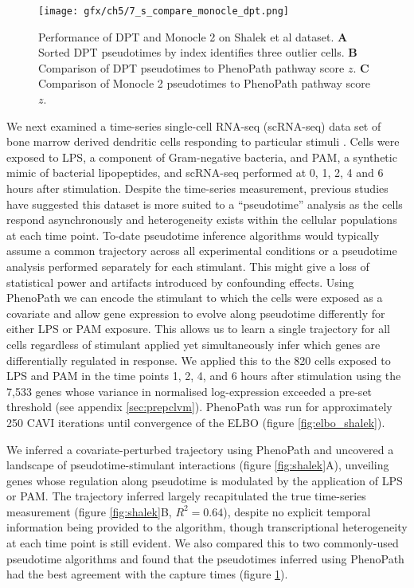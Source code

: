 \begin{figure}
   \texttt{[image: gfx/ch5/7\_s\_compare\_monocle\_dpt.png]}
   \caption{Performance of DPT and Monocle 2 on Shalek et al dataset.
\textbf{A} Sorted DPT pseudotimes by index identifies three outlier cells. \textbf{B} Comparison of DPT pseudotimes to PhenoPath pathway score $z$. \textbf{C} Comparison of Monocle 2 pseudotimes to PhenoPath pathway score $z$.}
	\label{fig:shalek_comparison}
\end{figure}

We next examined a time-series single-cell RNA-seq (scRNA-seq) data set of bone marrow derived dendritic cells responding to particular stimuli \cite{Shalek2014-cg}. Cells were exposed to LPS, a component of Gram-negative bacteria, and PAM, a synthetic mimic of bacterial lipopeptides, and scRNA-seq performed at 0, 1, 2, 4 and 6 hours after stimulation. Despite the time-series measurement, previous studies have suggested this dataset is more suited to a ``pseudotime'' analysis as the cells respond asynchronously and heterogeneity exists within the cellular populations at each time point\cite{Reid2016-yo}. To-date pseudotime inference algorithms would typically assume a common trajectory across all experimental conditions or a pseudotime analysis  performed separately for each stimulant. This might give a loss of statistical power and artifacts introduced by confounding effects. Using PhenoPath we can encode the stimulant to which the cells were exposed as a covariate and allow gene expression to evolve along pseudotime differently for either LPS or PAM exposure. This allows us to learn a single trajectory for all cells regardless of stimulant applied yet simultaneously infer which genes are differentially regulated in response. We applied this to the 820 cells exposed to LPS and PAM in the time points 1, 2, 4, and 6 hours after stimulation using the 7,533 genes whose variance in normalised log-expression exceeded a pre-set threshold (see appendix \ref{sec:prepclvm}). PhenoPath was run for approximately 250 CAVI iterations until convergence of the ELBO (figure \ref{fig:elbo_shalek}).

We inferred a covariate-perturbed trajectory using PhenoPath and uncovered a landscape of pseudotime-stimulant interactions (figure \ref{fig:shalek}A), unveiling genes whose regulation along pseudotime is modulated by the application of LPS or PAM. The trajectory inferred largely recapitulated the true time-series measurement (figure \ref{fig:shalek}B, $R^2 = 0.64$), despite no explicit temporal information being provided to the algorithm, though transcriptional heterogeneity at each time point is still evident. We also compared this to two commonly-used pseudotime algorithms and found that the pseudotimes inferred using PhenoPath had the best agreement with the capture times (figure \ref{fig:shalek_comparison}).


